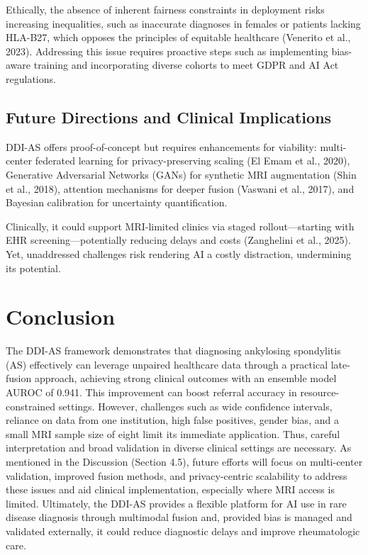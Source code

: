 \documentclass[12pt, a4paper]{article}
\begin{document}
Ethically, the absence of inherent fairness constraints in deployment risks increasing inequalities, such as inaccurate diagnoses in females or patients lacking HLA-B27, which opposes the principles of equitable healthcare (Venerito et al., 2023). Addressing this issue requires proactive steps such as implementing bias-aware training and incorporating diverse cohorts to meet GDPR and AI Act regulations.

\subsection{Future Directions and Clinical Implications}
DDI-AS offers proof-of-concept but requires enhancements for viability: multi-center federated learning for privacy-preserving scaling (El Emam et al., 2020), Generative Adversarial Networks (GANs) for synthetic MRI augmentation (Shin et al., 2018), attention mechanisms for deeper fusion (Vaswani et al., 2017), and Bayesian calibration for uncertainty quantification. 

Clinically, it could support MRI-limited clinics via staged rollout—starting with EHR screening—potentially reducing delays and costs (Zanghelini et al., 2025). Yet, unaddressed challenges risk rendering AI a costly distraction, undermining its potential.

\section{Conclusion}
The DDI-AS framework demonstrates that diagnosing ankylosing spondylitis (AS) effectively can leverage unpaired healthcare data through a practical late-fusion approach, achieving strong clinical outcomes with an ensemble model AUROC of 0.941. This improvement can boost referral accuracy in resource-constrained settings. However, challenges such as wide confidence intervals, reliance on data from one institution, high false positives, gender bias, and a small MRI sample size of eight limit its immediate application. Thus, careful interpretation and broad validation in diverse clinical settings are necessary. As mentioned in the Discussion (Section 4.5), future efforts will focus on multi-center validation, improved fusion methods, and privacy-centric scalability to address these issues and aid clinical implementation, especially where MRI access is limited. Ultimately, the DDI-AS provides a flexible platform for AI use in rare disease diagnosis through multimodal fusion and, provided bias is managed and validated externally, it could reduce diagnostic delays and improve rheumatologic care.
\end{document}
